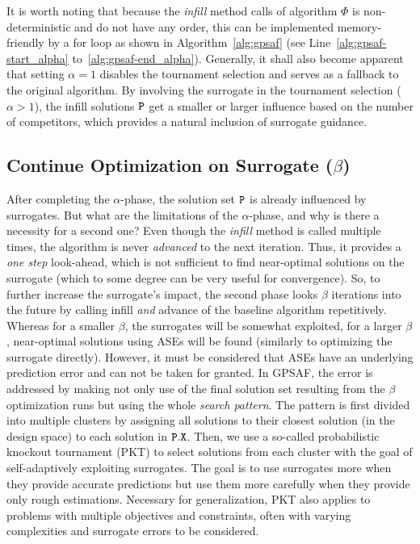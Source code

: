 \documentclass[journal]{IEEEtran}
\begin{document}
It is worth noting that because the \emph{infill} method calls of algorithm $\Phi$ is non-deterministic and do not have any order, this can be implemented memory-friendly by a for loop as shown in Algorithm~\ref{alg:gpsaf} (see Line~\ref{alg:gpsaf-start_alpha} to~\ref{alg:gpsaf-end_alpha}). 
Generally, it shall also become apparent that setting $\alpha=1$ disables the tournament selection and serves as a fallback to the original algorithm. By involving the surrogate in the tournament selection ($\alpha > 1$), the infill solutions $\tt{P}$ get a smaller or larger influence based on the number of competitors, which provides a natural inclusion of surrogate guidance.


\subsection{Continue Optimization on Surrogate ($\beta$)}


After completing the $\alpha$-phase, the solution set $\tt{P}$ is already influenced by surrogates. But what are the limitations of the $\alpha$-phase, and why is there a necessity for a second one?
Even though the \emph{infill} method is called multiple times, the algorithm is never \emph{advanced} to the next iteration. Thus, it provides a \emph{one step} look-ahead, which is not sufficient to find near-optimal solutions on the surrogate (which to some degree can be very useful for convergence).
So, to further increase the surrogate's impact, the second phase looks $\beta$ iterations into the future by calling infill \emph{and} advance of the baseline algorithm repetitively.
Whereas for a smaller $\beta$, the surrogates will be somewhat exploited, for a larger $\beta$, near-optimal solutions using ASEs will be found (similarly to optimizing the surrogate directly).
However, it must be considered that ASEs have an underlying prediction error and can not be taken for granted.
In GPSAF, the error is addressed by making not only use of the final solution set resulting from the $\beta$ optimization runs but using the whole \emph{search pattern}. 
The pattern is first divided into multiple clusters by assigning all solutions to their closest solution (in the design space) to each solution in $\tt{P}.X$.
Then, we use a so-called probabilistic knockout tournament (PKT) to select solutions from each cluster with the goal of self-adaptively exploiting surrogates. The goal is to use surrogates more when they provide accurate predictions but use them more carefully when they provide only rough estimations. 
Necessary for generalization, PKT also applies to problems with multiple objectives and constraints, often with varying complexities and surrogate errors to be considered.
\end{document}
